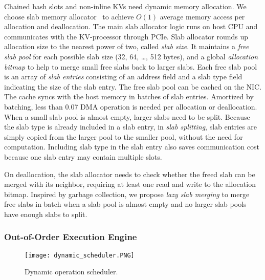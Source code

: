 Chained hash slots and non-inline KVs need dynamic memory allocation.
We choose slab memory allocator~\cite{bonwick1994slab} to achieve $O(1)$ average memory access per allocation and deallocation. The main slab allocator logic runs on host CPU and communicates with the KV-processor through PCIe.
Slab allocator rounds up allocation size to the nearest power of two, called \textit{slab size}.
It maintains a \textit{free slab pool} for each possible slab size (32, 64, \ldots, 512 bytes), and a global \textit{allocation bitmap} to help to merge small free slabs back to larger slabs.
Each free slab pool is an array of \textit{slab entries} consisting of an address field and a slab type field indicating the size of the slab entry.
The free slab pool can be cached on the NIC. The cache syncs with the host memory in batches of slab entries. Amortized by batching, less than 0.07 DMA operation is needed per allocation or deallocation.
When a small slab pool is almost empty, larger slabs need to be split.
Because the slab type is already included in a slab entry, in \textit{slab splitting}, slab entries are simply copied from the larger pool to the smaller pool, without the need for computation.
Including slab type in the slab entry also saves communication cost because one slab entry may contain multiple slots.

On deallocation, the slab allocator needs to check whether the freed slab can be merged with its neighbor, requiring at least one read and write to the allocation bitmap.
Inspired by garbage collection, we propose \textit{lazy slab merging} to merge free slabs in batch when a slab pool is almost empty and no larger slab pools have enough slabs to split.

\subsubsection{Out-of-Order Execution Engine}
\label{kvdirect:sec:ooo}

\begin{figure}[t]
\centering
\texttt{[image: dynamic\_scheduler.PNG]}
\caption{Dynamic operation scheduler.}
\label{kvdirect:fig:ooo-mem-access}
\end{figure}

